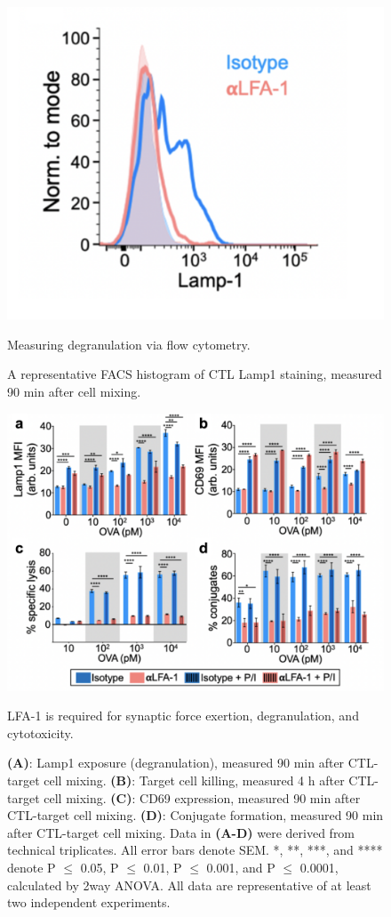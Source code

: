\begin{figure}[htbp]
	\centering
	\includegraphics[width=0.7\columnwidth]{../figures/chapter3/fig1flow.png}
	\caption{Measuring degranulation via flow cytometry.}
	\caption*{A representative FACS histogram of CTL Lamp1 staining, measured 90 min after cell mixing.}
	\label{fig:fig1flow}
\end{figure} 

\begin{figure}[htbp]
	\centering
	\includegraphics[width=1.0\columnwidth]{../figures/chapter3/fig1assays.png}
	\caption{LFA-1 is required for synaptic force exertion, degranulation, and cytotoxicity.}
	\caption*{\textbf{(A)}: Lamp1 exposure (degranulation), measured 90 min after CTL-target cell mixing. \textbf{(B)}: Target cell killing, measured 4 h after CTL-target cell mixing. \textbf{(C)}: CD69 expression, measured 90 min after CTL-target cell mixing.  \textbf{(D)}: Conjugate formation, measured 90 min after CTL-target cell mixing. Data in \textbf{(A-D)} were derived from technical triplicates. All error bars denote SEM. *, **, ***, and **** denote P $\leq$ 0.05, P $\leq$ 0.01, P $\leq$ 0.001, and P $\leq$ 0.0001, calculated by 2way ANOVA. All data are representative of at least two independent experiments.}
	\label{fig:fig1assays}
\end{figure} 


